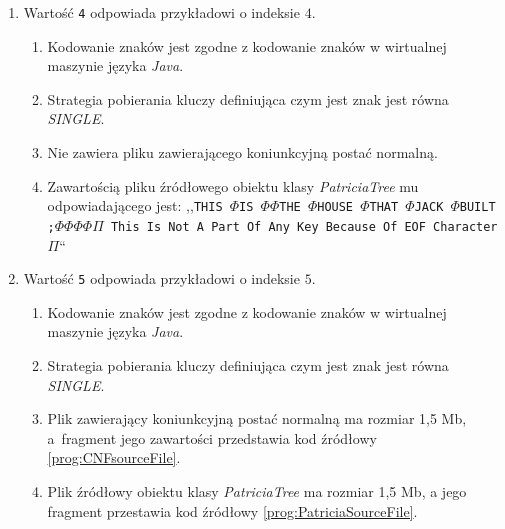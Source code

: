 \begin{enumerate}
\begin{enumerate}[label*=\arabic*.]
    	            \item Wartość \texttt{4} odpowiada przykładowi o indeksie $4$.
    	                \begin{enumerate}
    	                    \item Kodowanie znaków jest zgodne z kodowanie znaków w wirtualnej maszynie języka \emph{Java}.
    	                    \item Strategia pobierania kluczy definiująca czym jest znak jest równa \emph{SINGLE}.
    	                    \item Nie zawiera pliku zawierającego koniunkcyjną postać normalną.
    	                    \item Zawartością pliku źródłowego obiektu klasy \emph{PatriciaTree} mu odpowiadającego jest: \newline
    	                ,,\texttt{THIS $\Phi$IS $\Phi\Phi$THE $\Phi$HOUSE $\Phi$THAT $\Phi$JACK $\Phi$BUILT ;$\Phi\Phi\Phi\Phi\Pi$ This Is Not A Part Of Any Key Because Of EOF Character $\Pi$}``
    	                \end{enumerate}
    	                
    	            \item Wartość \texttt{5} odpowiada przykładowi o indeksie $5$.
    	                \begin{enumerate}
    	                    \item Kodowanie znaków jest zgodne z kodowanie znaków w wirtualnej maszynie języka \emph{Java}.
    	                    \item Strategia pobierania kluczy definiująca czym jest znak jest równa \emph{SINGLE}.
    	                    \item Plik zawierający koniunkcyjną postać normalną ma rozmiar 1,5 Mb, a~fragment jego zawartości przedstawia kod źródłowy \ref{prog:CNFsourceFile}.
    	                    \item Plik źródłowy obiektu klasy \emph{PatriciaTree} ma rozmiar 1,5 Mb, a jego fragment przestawia kod źródłowy \ref{prog:PatriciaSourceFile}.
    	                \end{enumerate}
    	                

\end{enumerate}
\end{enumerate}

